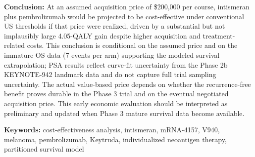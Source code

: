\documentclass[12pt,a4paper]{article}
\begin{document}
\textbf{Conclusion:} At an assumed acquisition price of \$200,000 per course, intismeran plus \mbox{pembrolizumab} would be projected to be cost-effective under conventional US thresholds if that price were realized, driven by a substantial but not implausibly large 4.05-QALY gain despite higher acquisition and treatment-related costs. This conclusion is conditional on the assumed price and on the immature OS data (7 events per arm) supporting the modeled survival extrapolation; PSA results reflect curve-fit uncertainty from the Phase 2b KEYNOTE-942 landmark data and do not capture full trial sampling uncertainty. The actual value-based price depends on whether the recurrence-free benefit proves durable in the Phase 3 trial and on the eventual negotiated acquisition price. This early economic evaluation should be interpreted as preliminary and updated when Phase 3 mature survival data become available.

\noindent\parbox{0.94\linewidth}{\textbf{Keywords:} cost-effectiveness analysis, intismeran, mRNA-4157, V940, melanoma, \mbox{pembrolizumab}, Keytruda, individualized neoantigen therapy, partitioned survival model}

\vspace{1.2em}

\begin{center}
\end{center}
\end{document}
